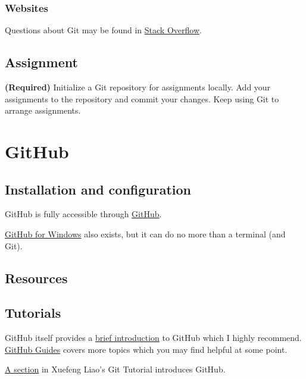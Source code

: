 \documentclass[english]{pkupaper}
\begin{document}
\subsubsection{Websites}

Questions about Git may be found in \href{https://stackoverflow.com/}{Stack Overflow}.

\subsection{Assignment}

\begin{thmquestion}
\textbf{(Required)} Initialize a Git repository for assignments locally. Add your assignments to the repository and commit your changes. Keep using Git to arrange assignments.
\end{thmquestion}

\section{GitHub}

\subsection{Installation and configuration}

GitHub is fully accessible through \href{https://github.com/}{GitHub}.

\href{https://desktop.github.com/}{GitHub for Windows} also exists, but it can do no more than a terminal (and Git).

\subsection{Resources}

\subsection{Tutorials}

GitHub itself provides a \href{https://guides.github.com/activities/hello-world/}{brief introduction} to GitHub which I highly recommend. \href{https://guides.github.com/}{GitHub Guides} covers more topics which you may find helpful at some point.

\href{https://www.liaoxuefeng.com/wiki/0013739516305929606dd18361248578c67b8067c8c017b000/00137628548491051ccfaef0ccb470894c858999603fedf000}{A section} in Xuefeng Liao's Git Tutorial introduces GitHub.
\end{document}
